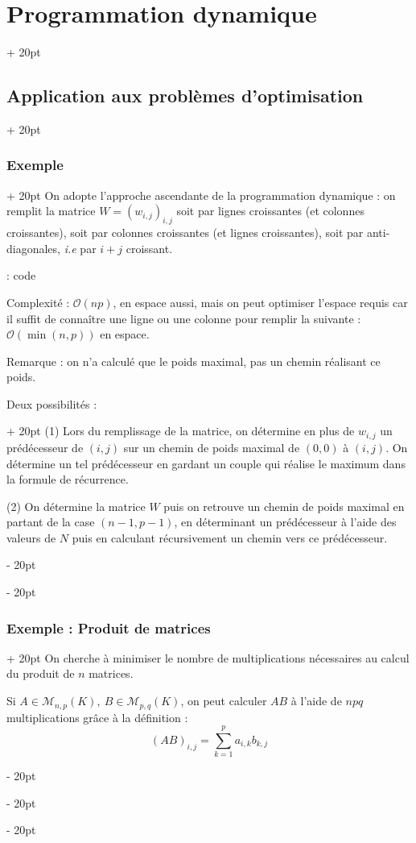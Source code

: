 \documentclass[a4paper, 12pt, twoside]{article}
\newcommand{\ind}[1][20pt]{\advance\leftskip + #1}
\newcommand{\deind}[1][20pt]{\advance\leftskip - #1}
\newenvironment{indt}[2][20pt]{#2 \par \ind[#1]}{\par \deind} %
\begin{document}
\begin{indt}{\section{Programmation dynamique}}
\begin{indt}{\subsection{Application aux problèmes d'optimisation}}
\begin{indt}{\subsubsection{Exemple}}
                On adopte l'approche ascendante de la programmation dynamique : on remplit la matrice $W = (w_{i, j})_{i, j}$ soit par lignes croissantes (et colonnes croissantes), soit par colonnes croissantes (et lignes croissantes), soit par anti-diagonales, \textit{i.e} par $i + j$ croissant.
                
                 : code
                
                \vspace{12pt}
                
                Complexité : $\mathcal O(np)$, en espace aussi, mais on peut optimiser l'espace requis car il suffit de connaître une ligne ou une colonne pour remplir la suivante : $\mathcal O(\min(n, p))$ en espace.
                
                \vspace{12pt}
                
                Remarque : on n'a calculé que le poids maximal, pas un chemin réalisant ce poids.
                
                \begin{indt}{Deux possibilités :}
                    (1) Lors du remplissage de la matrice, on détermine en plus de $w_{i, j}$ un prédécesseur de $(i, j)$ sur un chemin de poids maximal de $(0, 0)$ à $(i ,j)$. On détermine un tel prédécesseur en gardant un couple qui réalise le maximum dans la formule de récurrence.
                    
                    (2) On détermine la matrice $W$ puis on retrouve un chemin de poids maximal en partant de la case $(n - 1, p - 1)$, en déterminant un prédécesseur à l'aide des valeurs de $N$ puis en calculant récursivement un chemin vers ce prédécesseur.
                \end{indt}
            \end{indt}
            
            \vspace{12pt}
            
            \begin{indt}{\subsubsection{Exemple : Produit de matrices}}
                On cherche à minimiser le nombre de multiplications nécessaires au calcul du produit de $n$ matrices.
                
                Si $A \in \mathcal M_{n, p}(K),\ B \in \mathcal M_{p, q} (K)$, on peut calculer $AB$ à l'aide de $npq$ multiplications grâce à la définition :
                    \[ (AB)_{i, j} = \sum_{k = 1}^p a_{i,k} b_{k, j} \]
                

\end{indt}
\end{indt}
\end{indt}
\end{document}
